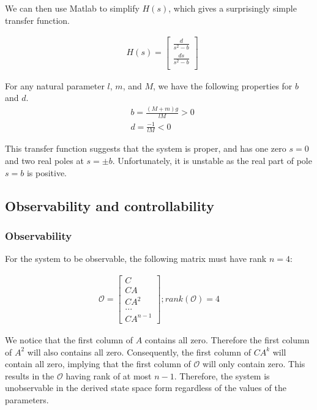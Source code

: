 \documentclass [12pt,letterpaper]{exam}
\begin{document}
We can then use Matlab to simplify $H(s)$, which gives a surprisingly simple transfer function.

\begin{align}
& H(s) = \begin{bmatrix} 
\frac{d}{s^2 - b} \\
\frac{ds}{s^2 - b} \\
\end{bmatrix}
\end{align}

For any natural parameter $l$, $m$, and $M$, we have the following properties for $b$ and $d$.
\begin{align}
& b = \frac{(M + m)g}{lM} > 0 \\
& d = \frac{-1}{lM} < 0
\end{align}

This transfer function suggests that the system is proper, and has one zero $s = 0$ and two real poles at $s = \pm b$. Unfortunately, it is unstable as the real part of pole $s = b$ is positive.

\subsection{Observability and controllability}
\subsubsection{Observability}

For the system to be observable, the following matrix must have rank $n = 4$:

\begin{align}
\mathcal{O} =
\begin{bmatrix}
C \\
CA \\
CA^2 \\
... \\
CA^{n-1}
\end{bmatrix} ; rank(\mathcal{O}) = 4
\end{align}

We notice that the first column of $A$ contains all zero. Therefore the first column of $A^2$ will also contains all zero. Consequently, the first column of $CA^{k}$ will contain all zero, implying that the first column of $\mathcal{O}$ will only contain zero. This results in the $\mathcal{O}$ having rank of at most $n - 1$. Therefore, the system is unobservable in the derived state space form regardless of the values of the parameters.
\end{document}
